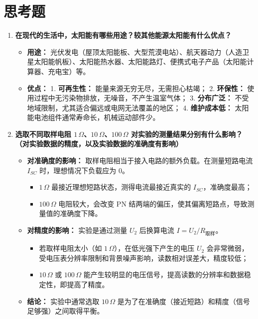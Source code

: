 \documentclass[11pt]{article}
\begin{document}
\section{思考题}

\begin{enumerate}
    \item \textbf{在现代的生活中，太阳能有哪些用途？较其他能源太阳能有什么优点？}
    \begin{itemize}
        \item \textbf{用途：} 光伏发电（屋顶太阳能板、大型荒漠电站）、航天器动力（人造卫星太阳能帆板）、太阳能热水器、太阳能路灯、便携式电子产品（太阳能计算器、充电宝）等。
        \item \textbf{优点：} 
            1. \textbf{可再生性：} 能量来源无穷无尽，无需担心枯竭；
            2. \textbf{环保性：} 使用过程中无污染物排放，无噪音，不产生温室气体；
            3. \textbf{分布广泛：} 不受地域限制，尤其适合偏远或电网无法覆盖的地区；
            4. \textbf{维护成本低：} 太阳能电池组件通常寿命长，机械运动部件少。
    \end{itemize}

    \item \textbf{选取不同取样电阻 $1\,\Omega$、$10\,\Omega$、$100\,\Omega$ 对实验的测量结果分别有什么影响？（对实验数据的精度，以及实验数据的准确度有影响）}
    \begin{itemize}
        \item \textbf{对准确度的影响：} 取样电阻相当于接入电路的额外负载。在测量短路电流 $I_{SC}$ 时，理想情况下负载应为 0。
            \begin{itemize}
                \item $1\,\Omega$ 最接近理想短路状态，测得电流最接近真实的 $I_{SC}$，准确度最高；
                \item $100\,\Omega$ 电阻较大，会改变 PN 结两端的偏压，使其偏离短路点，导致测量值的准确度下降。
            \end{itemize}
        \item \textbf{对精度的影响：} 实验是通过测量 $U_2$ 后换算电流 $I = U_2 / R_{\text{取样}}$。
            \begin{itemize}
                \item 若取样电阻太小（如 $1\,\Omega$），在低光强下产生的电压 $U_2$ 会非常微弱，受电压表分辨率限制和背景噪声影响，读数相对误差大，精度较低；
                \item $10\,\Omega$ 或 $100\,\Omega$ 能产生较明显的电压信号，提高读数的分辨率和数据稳定性，即提高了精度。
            \end{itemize}
        \item \textbf{结论：} 实验中通常选取 $10\,\Omega$ 是为了在准确度（接近短路）和精度（信号足够强）之间取得平衡。
    \end{itemize}


\end{enumerate}
\end{document}
